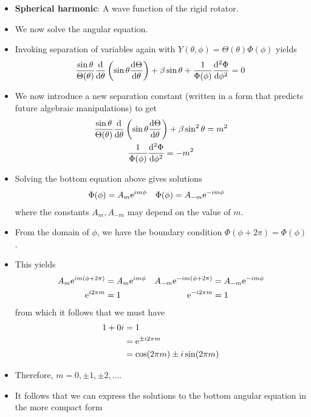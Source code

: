 \documentclass[../notes.tex]{subfiles}
\begin{document}
\begin{itemize}
\begin{itemize}
    \end{itemize}
    \item \textbf{Spherical harmonic}: A wave function of the rigid rotator.
    \item We now solve the angular equation.
    \item Invoking separation of variables again with $Y(\theta,\phi)=\Theta(\theta)\Phi(\phi)$ yields
    \begin{equation*}
        \frac{\sin\theta}{\Theta(\theta)}\dv{\theta}\left( \sin\theta\dv{\Theta}{\theta} \right)+\beta\sin\theta+\frac{1}{\Phi(\phi)}\dv[2]{\Phi}{\phi} = 0
    \end{equation*}
    \item We now introduce a new separation constant (written in a form that predicts future algebraic manipulations) to get
    \begin{gather*}
        \frac{\sin\theta}{\Theta(\theta)}\dv{\theta}\left( \sin\theta\dv{\Theta}{\theta} \right)+\beta\sin^2\theta = m^2\\
        \frac{1}{\Phi(\phi)}\dv[2]{\Phi}{\phi} = -m^2
    \end{gather*}
    \item Solving the bottom equation above gives solutions
    \begin{align*}
        \Phi(\phi) &= A_m\e[im\phi]&
        \Phi(\phi) &= A_{-m}\e[-im\phi]
    \end{align*}
    where the constants $A_m,A_{-m}$ may depend on the value of $m$.
    \item From the domain of $\phi$, we have the boundary condition $\Phi(\phi+2\pi)=\Phi(\phi)$.
    \item This yields
    \begin{align*}
        A_m\e[im(\phi+2\pi)] &= A_m\e[im\phi]&
            A_{-m}\e[-im(\phi+2\pi)] &= A_{-m}\e[-im\phi]\\
        \e[i2\pi m] &= 1&
            \e[-i2\pi m] &= 1
    \end{align*}
    from which it follows that we must have
    \begin{align*}
        1+0i &= 1\\
        &= \e[\pm i2\pi m]\\
        &= \cos(2\pi m)\pm i\sin(2\pi m)
    \end{align*}
    \item Therefore, $m=0,\pm 1,\pm 2,\dots$.
    \item It follows that we can express the solutions to the bottom angular equation in the more compact form

\end{itemize}
\end{document}

